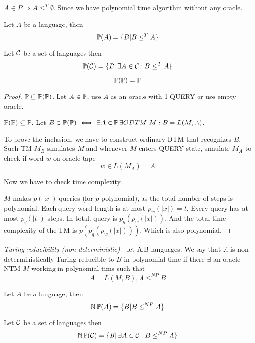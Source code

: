 \begin{example}
	$A \in P \Rightarrow A \leq^T \emptyset$. Since we have polynomial time algorithm without any oracle.
\end{example}

\begin{definition}[$\TP(A)$]
	Let $A$ be a language, then
	\[ \operatorname{\mathbb{P}}(A) = \{ B | B \leq^T A \} \]
\end{definition}
\begin{definition}[$\TP(\C)$]
	Let $\operatorname{\mathcal{C}}$ be a set of languages then
	\[ \operatorname{\mathbb{P}}(\operatorname{\mathcal{C}}) = \{ B |\, \exists A \in \operatorname{\mathcal{C}}: B \leq^T A \} \]
\end{definition}

\begin{theorem}[$\TP(\TP) = \TP$]\label{p_eq_pp}
	\[ \operatorname{\mathbb{P}}(\operatorname{\mathbb{P}}) = \operatorname{\mathbb{P}} \]
\end{theorem}
\begin{proof}
	$ \operatorname{\mathbb{P}} \subseteq \operatorname{\mathbb{P}}(\operatorname{\mathbb{P}})$. Let $A \in \operatorname{\mathbb{P}}$, use $A$ as an oracle with 1 QUERY or use empty oracle.

	$\operatorname{\mathbb{P}}(\operatorname{\mathbb{P}}) \subseteq \operatorname{\mathbb{P}}$. Let $B \in \TP(\TP) \iff \exists A \in \TP \exists ODTM\ M: B = L(M, A)$.

	To prove the inclusion, we have to construct ordinary DTM that recognizes $B$.
	Such TM $M_B$ simulates $M$ and whenever $M$ enters QUERY state, simulate $M_A$ to check if word $w$ on oracle tape
	\[ w \in L(M_A) = A \]

	Now we have to check time complexity.

	$M$ makes $p(|x|)$ queries (for $p$ polynomial), as the total number of steps is polynomial.
	Each query word length is at most $p_w(|x|) = t$.
	Every query has at most $p_q(|t|)$ steps.
	In total, query is $p_q(p_w(|x|))$.
	And the total time complexity of the TM is $p(p_q(p_w(|x|)))$.
	Which is also polynomial.
\end{proof}

\begin{definition}
	\emph{Turing reducibility (non-deterministic)} - let A,B languages.
	We say that $A$ is non-deterministically Turing reducible to $B$ in polynomial time if there $\exists$ an oracle NTM $M$ working in polynomial time such that
	\[ A = L(M, B), A \leq^{NP} B \]
\end{definition}

\begin{definition}[$\TNP(A)$]
	Let $A$ be a language, then
	\[ \operatorname{\operatorname{\mathbb{N}}\mathbb{P}}(A) = \{ B | B \leq^{NP} A \} \]
\end{definition}
\begin{definition}[$\TNP(\C)$]
	Let $\operatorname{\mathcal{C}}$ be a set of languages then
	\[ \operatorname{\operatorname{\mathbb{N}}\mathbb{P}}(\operatorname{\mathcal{C}}) = \{ B |\, \exists A \in \operatorname{\mathcal{C}}: B \leq^{NP} A \} \]
\end{definition}

